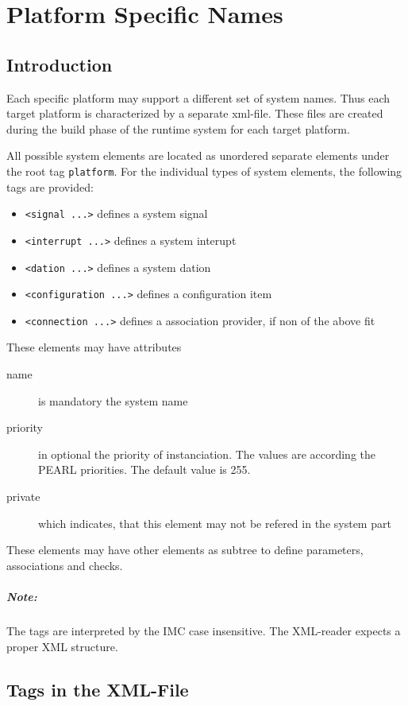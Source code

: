 \chapter{Platform Specific Names}

\section{Introduction}
Each specific platform may support a different set of system names.
Thus each target platform is characterized by a separate xml-file.
These files are created during the build phase of the runtime system
for each target platform.

All possible system elements are located as unordered separate 
elements under the root tag \verb|platform|.
For the individual types of system elements, the following tags are
provided:
\begin{itemize}
\item \verb|<signal ...>| defines a system signal
\item \verb|<interrupt ...>| defines a system interupt
\item \verb|<dation ...>| defines a system dation
\item \verb|<configuration ...>| defines a configuration item
\item \verb|<connection ...>| defines a association provider, if 
   non of the above fit
\end{itemize}

These elements may have attributes 
\begin{description}
\item [name] is mandatory the system name
\item [priority] in optional the priority of instanciation. 
   The values are according the PEARL priorities. The default value is 255.
\item [private] which indicates, that this element may not be 
  refered in the system part
\end{description}

These elements may have other elements as subtree to define parameters, associations and checks.

\paragraph{Note:} The tags are interpreted by the IMC case insensitive. The XML-reader 
expects a  proper XML structure.

\section{Tags in the XML-File}
